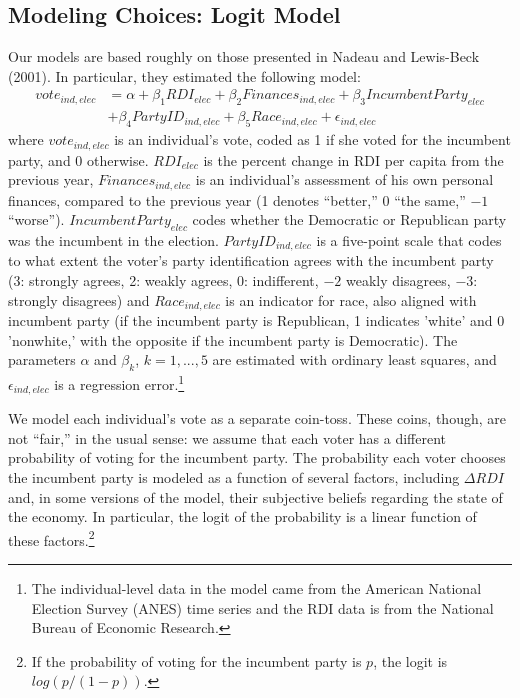 \documentclass[11pt]{article}
\begin{document}
\subsection{Modeling Choices: Logit Model}
Our models are based roughly on those presented in Nadeau and Lewis-Beck (2001). In particular, they estimated the following model:
\begin{align*}
  vote_{ind,elec}&=\alpha+\beta_1 RDI_{elec}+\beta_2 Finances_{ind,elec} +\beta_3 IncumbentParty_{elec}\\
  &+\beta_4 PartyID_{ind,elec}+\beta_5 Race_{ind,elec}+\epsilon_{ind,elec}
\end{align*}
where $vote_{ind,elec}$ is an individual's vote, coded as 1 if she voted for the incumbent party, and 0 otherwise. $RDI_{elec}$ is the percent change in RDI per capita from the previous year, $Finances_{ind,elec}$ is an individual's assessment of his own personal finances, compared to the previous year (1 denotes
``better,'' 0 ``the same,'' $-1$ ``worse''). $IncumbentParty_{elec}$ codes whether the Democratic or Republican
party was the incumbent in the election. $PartyID_{ind,elec}$ is a five-point scale that codes to what extent
the voter's party identification agrees with the incumbent party (3: strongly agrees, 2: weakly agrees, 0: indifferent, $-2$ weakly disagrees, $-3$: strongly disagrees) and $Race_{ind,elec}$ is an indicator for race, also aligned with incumbent party (if the incumbent party is Republican, 1 indicates 'white' and 0 'nonwhite,' with the opposite if the incumbent party is Democratic). The parameters $\alpha$ and $\beta_k$, $k=1,...,5$ are estimated with ordinary least squares, and $\epsilon_{ind,elec}$ is a regression error.\footnote{The individual-level data in the model came from the American National
Election Survey (ANES) time series \cite{ANES} and the RDI data is from the National Bureau of Economic Research.}

We model each individual's vote as a separate coin-toss.
These coins, though, are not ``fair,'' in the usual sense: we assume that each voter has a different probability of voting for the incumbent party.
The probability each voter chooses the incumbent party is modeled as a function of several factors, including $\Delta RDI$ and, in some versions of the model, their subjective beliefs regarding the state of the economy.
In particular, the logit of the probability is a linear function of these factors.\footnote{If the probability of voting for the incumbent party is $p$, the logit is $log(p/(1-p))$.}
\end{document}
